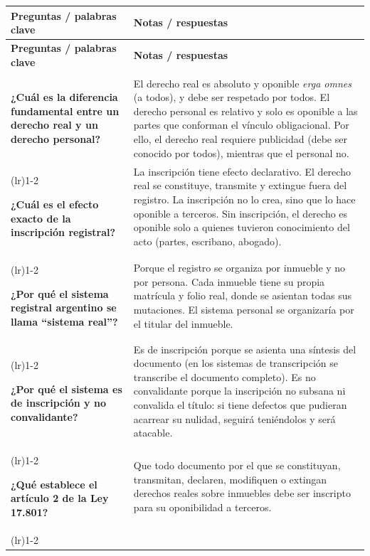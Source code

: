 \documentclass[12pt,oneside]{book}
\begin{document}
\begingroup
\RaggedRight
\begin{longtable}{>{\RaggedRight\arraybackslash}p{}>{\RaggedRight\arraybackslash}p{}}
\toprule
\textbf{Preguntas / palabras clave} & \textbf{Notas / respuestas} \\
\midrule
\endfirsthead
\toprule
\textbf{Preguntas / palabras clave} & \textbf{Notas / respuestas} \\
\midrule
\endhead
\midrule
\multicolumn{2}{r}{\small\emph{Continúa en la página siguiente}} \\
\endfoot
\bottomrule
\endlastfoot

\textbf{¿Cuál es la diferencia fundamental entre un derecho real y un derecho personal?} &
El derecho real es absoluto y oponible \emph{erga omnes} (a todos), y debe ser respetado por todos. El derecho personal es relativo y solo es oponible a las partes que conforman el vínculo obligacional. Por ello, el derecho real requiere publicidad (debe ser conocido por todos), mientras que el personal no. \\
\addlinespace
\cmidrule(lr){1-2}

\textbf{¿Cuál es el efecto exacto de la inscripción registral?} &
La inscripción tiene efecto declarativo. El derecho real se constituye, transmite y extingue fuera del registro. La inscripción no lo crea, sino que lo hace oponible a terceros. Sin inscripción, el derecho es oponible solo a quienes tuvieron conocimiento del acto (partes, escribano, abogado). \\
\addlinespace
\cmidrule(lr){1-2}

\textbf{¿Por qué el sistema registral argentino se llama ``sistema real''?} &
Porque el registro se organiza por inmueble y no por persona. Cada inmueble tiene su propia matrícula y folio real, donde se asientan todas sus mutaciones. El sistema personal se organizaría por el titular del inmueble. \\
\addlinespace
\cmidrule(lr){1-2}

\textbf{¿Por qué el sistema es de inscripción y no convalidante?} &
Es de inscripción porque se asienta una síntesis del documento (en los sistemas de transcripción se transcribe el documento completo). Es no convalidante porque la inscripción no subsana ni convalida el título: si tiene defectos que pudieran acarrear su nulidad, seguirá teniéndolos y será atacable. \\
\addlinespace
\cmidrule(lr){1-2}

\textbf{¿Qué establece el artículo 2 de la Ley 17.801?} &
Que todo documento por el que se constituyan, transmitan, declaren, modifiquen o extingan derechos reales sobre inmuebles debe ser inscripto para su oponibilidad a terceros. \\
\addlinespace
\cmidrule(lr){1-2}


\end{longtable}
\end{document}
